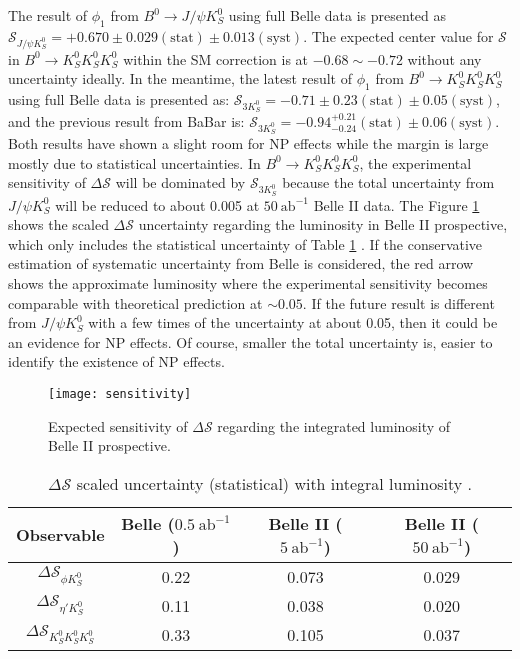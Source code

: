 The result of $\phi_1$ from $B^0 \to J/\psi K_S^0$ using full Belle data is presented as $\mathcal{S}_{J/\psi K^0_S} = + 0.670 \pm 0.029 (\text{stat}) \pm 0.013(\text{syst})$. The expected center value for $\mathcal{S}$ in $B^0 \to K_S^0  K_S^0  K_S^0$ within the SM correction is at $ -0.68 \sim -0.72$ without any uncertainty ideally. In the meantime, the latest result of  $\phi_1$ from $B^0 \to K_S^0  K_S^0  K_S^0$ using full Belle data \cite{kang2020measurement} is presented as: $\mathcal{S}_{3K^0_S} = - 0.71 \pm 0.23 (\text{stat}) \pm 0.05(\text{syst})$, and the previous result from BaBar \cite{Lees:2011nf} is: $\mathcal{S}_{ 3K^0_S} = - 0.94 ^{+0.21}_{-0.24} (\text{stat}) \pm 0.06(\text{syst})$. Both results have shown a slight room for NP effects while the margin is large mostly due to statistical uncertainties. In $B^0 \to K_S^0  K_S^0  K_S^0$, the experimental sensitivity of $\Delta \mathcal{S}$ will be dominated by $\mathcal{S}_{3K^0_S}$ because the total uncertainty from $J/\psi K^0_S$ will be reduced to about 0.005\cite{b2book} at $50 \: \text{ab}^{-1}$ Belle II data. The Figure \ref{fig:sensitivity} shows the scaled $\Delta \mathcal{S}$ uncertainty regarding the luminosity in Belle II prospective\cite{Abe:2010gxa}, which only includes the statistical uncertainty of Table \ref{tab:sensitivity} . If the conservative estimation of systematic uncertainty from Belle is considered, the red arrow shows the approximate luminosity where the experimental sensitivity becomes comparable with theoretical prediction at $\sim 0.05$. If the future result is different from $J/\psi K^0_S$ with a few times of the uncertainty at about 0.05, then it could be an evidence for NP effects. Of course, smaller the total uncertainty is, easier to identify the existence of NP effects.

\begin{figure}[H]
	\centering
	\texttt{[image: sensitivity]}
	\caption{Expected  sensitivity of $\Delta \mathcal{S}$ regarding the integrated luminosity of Belle II prospective.\cite{Abe:2010gxa}}
	\label{fig:sensitivity}
\end{figure}

\begin{table}[H]
	\centering
	\large
	\caption{$\Delta \mathcal{S}$ scaled uncertainty (statistical) with integral luminosity \cite{Abe:2010gxa}.}
	\label{tab:sensitivity}
	\begin{tabular}{c c c c}
		\toprule
		Observable & Belle ($0.5 \: \text{ab}^{-1}$) & Belle II ($5 \: \text{ab}^{-1}$)& Belle II ($50 \: \text{ab}^{-1}$)\\
		\hline
		$\Delta \mathcal{S}_{\phi K^0_S}$ & 0.22 &  0.073 & 0.029\\
		$\Delta \mathcal{S}_{\eta' K^0_S}$   & 0.11 &  0.038 & 0.020\\
		$\Delta \mathcal{S}_{ K^0_S K^0_S K^0_S}$ & 0.33 & 0.105 & 0.037\\
		\bottomrule
	\end{tabular}
\end{table}

